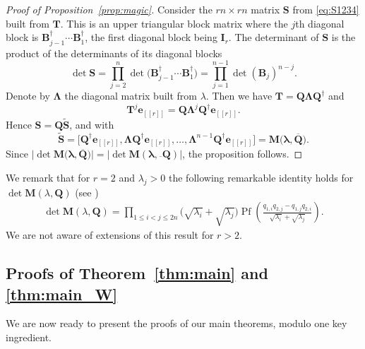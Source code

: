 \documentclass[pdftex]{sigma}
\numberwithin{equation}{section}
\theoremstyle{definition}
\newcommand{\T}{\dag}
\newcommand{\lst}[1]{[\![#1 ]\!]}
\newcommand{\mbf}[1]{\mathbf{#1}}
\newcommand{\wt}[1]{\widetilde{#1}}
\begin{document}
\begin{proof}[Proof of Proposition~\ref{prop:magic}]
 Consider the $rn \times rn $ matrix $\mbf{S}$ from \eqref{eq:S1234} built from $\mbf{T}$. This is an upper triangular block matrix where the $j$th diagonal block is $\mbf{B}_{j-1}^{\T}\cdots \mbf{B}_1^{\T}$, the first diagonal block being $\mbf{I}_r$. The determinant of $\mbf{S}$ is the product of the determinants of its diagonal blocks
 \[
 \det \mbf{S}=\prod_{j=2}^n \det\bigl(\mbf{B}_{j-1}^{\T}\cdots \mbf{B}_1^{\T}\bigr)=\prod_{j=1}^{n-1} \det(\mbf{B}_j)^{n-j}.
 \]
Denote by $\boldsymbol{\Lambda}$ the diagonal matrix built from $\lambda$. Then we have $\mbf{T}=\mbf{Q}\boldsymbol{\Lambda} \mbf{Q}^{\T}$ and
 \[
 \mbf{T}^{j} \mbf{e}_{\lst{r}}=
 \mbf{Q} \boldsymbol{\Lambda}^{j} \mbf{Q}^{\T}\mbf{e}_{\lst{r}}.
 \]
Hence $\mbf{S}= {\mbf{Q}} \widetilde{\mbf{S}}$, and \smash{$|{\det \mbf{S}}|=\bigl|{\det \wt{\mbf{S}}}\bigr|$} with
\begin{equation*}
 \widetilde{\mbf{S}}=\big[\mbf{Q}^{\T}\mbf{e}_{\lst{r}}, \boldsymbol{\Lambda}\mbf{Q}^{\T}\mbf{e}_{\lst{r}}, \dots, \boldsymbol{\Lambda}^{n-1}\mbf{Q}^{\T}\mbf{e}_{\lst{r}}\big]=\mbf{M}\bigl(\mbf{\lambda}, \overline{\mbf{Q}}\bigr).
\end{equation*}
Since $\big|{\det \mbf{M}\big(\mbf{\lambda}, \overline{\mbf{Q}}\big)}\big|=\big|{\det \mbf{M}(\mbf{\lambda}, {\overline{}\mbf{Q}})} |$, the proposition follows.
\end{proof}



We remark that for $r=2$ and $\lambda_j>0$ the following remarkable identity holds for $\det \mbf{M}({\lambda}, \mbf{Q})$ (see \cite[equation (52)]{LT2006})
\begin{align}\label{eq:Pfaffian_detM}
 \det \mbf{M}({\lambda}, \mbf{Q})=\prod_{1\le i<j\le 2n}\bigl(\sqrt{\lambda_i}+\sqrt{\lambda_j}\bigr) \operatorname{Pf}\left(\frac{q_{1,i}q_{2,j}-q_{1,j}q_{2,i}}{\sqrt{\lambda_i}+\sqrt{\lambda_j}}\right).
\end{align}
We are not aware of extensions of this result for $r>2$.




\subsection[Proofs of Theorem 1.1 and 1.6]{Proofs of Theorem~\ref{thm:main} and \ref{thm:main_W}}


We are now ready to present the proofs of our main theorems, modulo one key ingredient.
\end{document}
